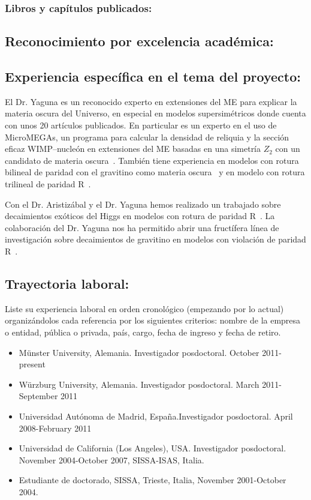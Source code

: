 \subsubsection{Libros y capítulos publicados:}
\subsection{Reconocimiento por excelencia académica:}
\subsection{Experiencia específica en el tema del proyecto:}
El Dr. Yaguna es un reconocido experto en extensiones del ME para
explicar la materia oscura del Universo, en especial en modelos
supersimétricos donde cuenta con unos 20 artículos publicados. En
particular es un experto en el uso de MicroMEGAs, un programa para
calcular la densidad de reliquia y la sección eficaz WIMP--nucleón en
extensiones del ME basadas en una simetría $Z_2$ con un candidato de
materia
oscura~\cite{Yaguna:2011qn,LopezHonorez:2010tb,Honorez:2010re,Choi:2009qc,Yaguna:2008hd,Goudelis:2009zz}. También
tiene experiencia en modelos con rotura bilineal de paridad con el
gravitino como materia oscura~\cite{Choi:2010jt,Choi:2010xn} y en
modelo con rotura trilineal de paridad
R~\cite{AristizabalSierra:2008ye}.

Con el Dr. Aristizábal y el Dr. Yaguna hemos realizado un trabajado
sobre decaimientos exóticos del Higgs en modelos con rotura de paridad
R~\cite{AristizabalSierra:2008ye}.  La colaboración del Dr. Yaguna nos
ha permitido abrir una fructífera línea de investigación sobre
decaimientos de gravitino en modelos con violación de paridad
R~\cite{Choi:2010jt}.
\subsection{Trayectoria laboral:}
\begin{instrucciones}
  Liste su experiencia laboral en orden cronológico (empezando por lo
  actual) organizándolos cada referencia por los siguientes criterios:
  nombre de la empresa o entidad, pública o privada, país, cargo,
  fecha de ingreso y fecha de retiro.
\end{instrucciones}
\begin{itemize}
\item M\"unster University, Alemania. Investigador posdoctoral. October 2011-present

\item W\"urzburg University, Alemania. Investigador posdoctoral. March 2011-September 2011

\item Universidad Autónoma de Madrid, España.Investigador posdoctoral. April 2008-February 2011

\item Universidad de California (Los Angeles), USA. Investigador posdoctoral. November 2004-October 2007, SISSA-ISAS, Italia. 

\item Estudiante de doctorado, SISSA, Trieste, Italia, November 2001-October 2004.

\end{itemize}

